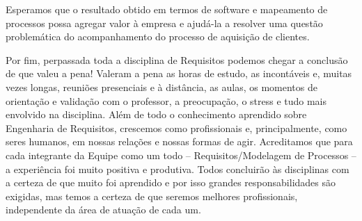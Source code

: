 Esperamos que o resultado obtido em termos de software e mapeamento de processos possa agregar valor à empresa e ajudá-la a resolver uma questão problemática do acompanhamento do processo de aquisição de clientes.

Por fim, perpassada toda a disciplina de Requisitos podemos chegar a conclusão de que valeu a pena! Valeram a pena as horas de estudo, as incontáveis e, muitas vezes longas, reuniões presenciais e à distância, as aulas, os momentos de orientação e validação com o professor, a preocupação, o stress e tudo mais envolvido na disciplina. Além de todo o conhecimento aprendido sobre Engenharia de Requisitos, crescemos como profissionais e, principalmente, como seres humanos, em nossas relações e nossas formas de agir. Acreditamos que para cada integrante da Equipe como um todo –  Requisitos/Modelagem de Processos – a experiência foi muito positiva e produtiva. Todos concluirão às disciplinas com a certeza de que muito foi aprendido e por isso grandes responsabilidades são exigidas, mas temos a certeza de que seremos melhores profissionais, independente da área de atuação de cada um.